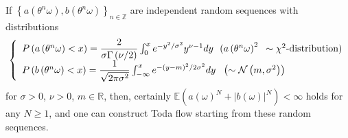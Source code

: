 \documentclass[a4paper]{article}%
\begin{document}
If $\left\{  a\left(  \theta^{n}\omega\right)  ,b\left(  \theta^{n}%
\omega\right)  \right\}  _{n\in\mathbb{Z}}$ are independent random sequences
with distributions%
\[
\left\{
\begin{array}
[c]{l}%
P\left(  a\left(  \theta^{n}\omega\right)  <x\right)  =\dfrac{2}{\sigma
\Gamma\left(  \nu/2\right)  }\int_{0}^{x}e^{-y^{2}/\sigma^{2}}y^{\nu
-1}dy\text{ \ }(a\left(  \theta^{n}\omega\right)  ^{2}\text{ }\sim\chi
^{2}\text{-distribution})\\
P\left(  b\left(  \theta^{n}\omega\right)  <x\right)  =\dfrac{1}{\sqrt
{2\pi\sigma^{2}}}\int_{-\infty}^{x}e^{-\left(  y-m\right)  ^{2}/2\sigma^{2}%
}dy\text{ \ }\left(  \sim\mathcal{N}\left(  m,\sigma^{2}\right)  \right)
\end{array}
\right.
\]
for $\sigma>0$, $\nu>0$, $m\in\mathbb{R}$, then, certainly $\mathbb{E}\left(
a\left(  \omega\right)  ^{N}+\left\vert b\left(  \omega\right)  \right\vert
^{N}\right)  <\infty$ holds for any $N\geq1$, and one can construct Toda flow
starting from these random sequences.
\end{document}
